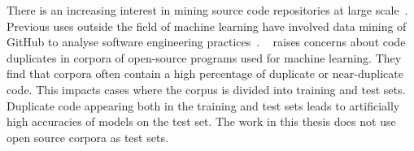 There is an increasing interest in mining source code repositories at large scale~\cite{Allamanis2013a,White2015a,Bird2009}. Previous uses outside the field of machine learning have involved data mining of GitHub to analyse software engineering practices~\cite{Wu2014,Guzman2014,Baishakhi2014a,Vasilescu2015}.
\citeauthor{Allamanis2018}~\cite{Allamanis2018} raises concerns about code duplicates in corpora of open-source programs used for machine learning. They find that corpora often contain a high percentage of duplicate or near-duplicate code. This impacts cases where the corpus is divided into training and test sets. Duplicate code appearing both in the training and test sets leads to artificially high accuracies of models on the test set. The work in this thesis does not use open source corpora as test sets.

